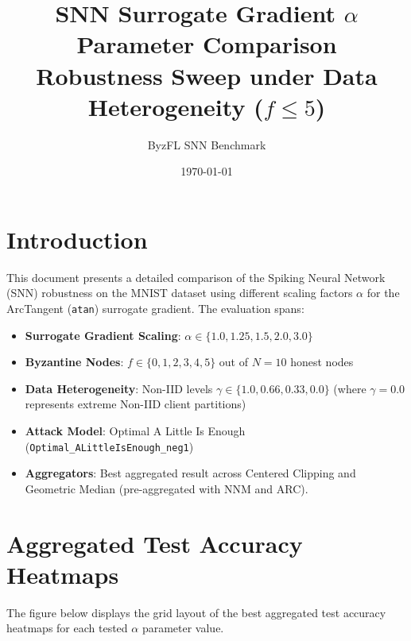 \documentclass{article}
\title{SNN Surrogate Gradient $\alpha$ Parameter Comparison\\Robustness Sweep under Data Heterogeneity ($f \le 5$)}
\author{ByzFL SNN Benchmark}
\date{\today}
\begin{document}
\maketitle

\section{Introduction}
This document presents a detailed comparison of the Spiking Neural Network (SNN) robustness on the MNIST dataset using different scaling factors $\alpha$ for the ArcTangent (\texttt{atan}) surrogate gradient. The evaluation spans:
\begin{itemize}
    \item \textbf{Surrogate Gradient Scaling}: $\alpha \in \{1.0, 1.25, 1.5, 2.0, 3.0\}$
    \item \textbf{Byzantine Nodes}: $f \in \{0, 1, 2, 3, 4, 5\}$ out of $N=10$ honest nodes
    \item \textbf{Data Heterogeneity}: Non-IID levels $\gamma \in \{1.0, 0.66, 0.33, 0.0\}$ (where $\gamma = 0.0$ represents extreme Non-IID client partitions)
    \item \textbf{Attack Model}: Optimal A Little Is Enough (\texttt{Optimal\_ALittleIsEnough\_neg1})
    \item \textbf{Aggregators}: Best aggregated result across Centered Clipping and Geometric Median (pre-aggregated with NNM and ARC).
\end{itemize}

\section{Aggregated Test Accuracy Heatmaps}
The figure below displays the grid layout of the best aggregated test accuracy heatmaps for each tested $\alpha$ parameter value.
\end{document}

